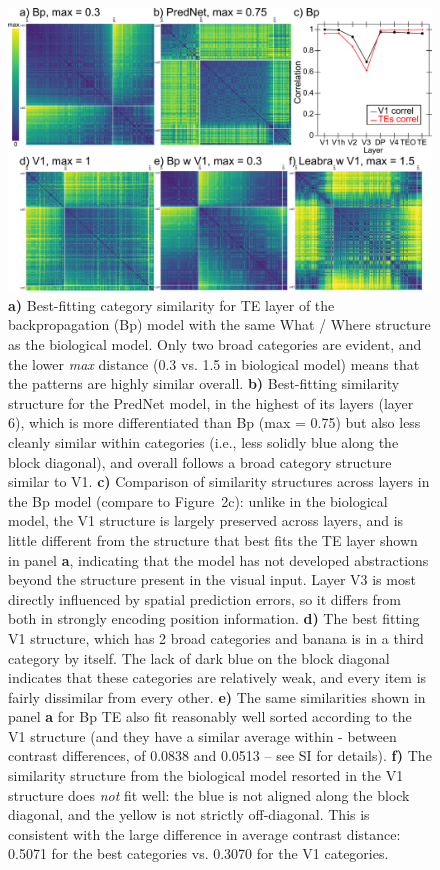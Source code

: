 \documentclass[11pt,twoside]{article}
\newif\myifpdf
\begin{document}
\begin{figure}
  \centering\includegraphics[width=4.5in]{fig_07} %
  \caption{{\bf a)} Best-fitting category similarity for TE layer of the backpropagation (Bp) model with the same What / Where structure as the biological model.  Only two broad categories are evident, and the lower \emph{max} distance (0.3 vs. 1.5 in biological model) means that the patterns are highly similar overall.  {\bf b)} Best-fitting similarity structure for the PredNet model, in the highest of its layers (layer 6), which is more differentiated than Bp (max = 0.75) but also less cleanly similar within categories (i.e., less solidly blue along the block diagonal), and overall follows a broad category structure similar to V1.  {\bf c)} Comparison of similarity structures across layers in the Bp model (compare to Figure~2c): unlike in the biological model, the V1 structure is largely preserved across layers, and is little different from the structure that best fits the TE layer shown in panel {\bf a}, indicating that the model has not developed abstractions beyond the structure present in the visual input.  Layer V3 is most directly influenced by spatial prediction errors, so it differs from both in strongly encoding position information.  {\bf d)} The best fitting V1 structure, which has 2 broad categories and banana is in a third category by itself.  The lack of dark blue on the block diagonal indicates that these categories are relatively weak, and every item is fairly dissimilar from every other.  {\bf e)} The same similarities shown in panel {\bf a} for Bp TE also fit reasonably well sorted according to the V1 structure (and they have a similar average within - between contrast differences, of 0.0838 and 0.0513 -- see SI for details).  {\bf f)} The similarity structure from the biological model resorted in the V1 structure does \emph{not} fit well: the blue is not aligned along the block diagonal, and the yellow is not strictly off-diagonal.  This is consistent with the large difference in average contrast distance: 0.5071 for the best categories vs. 0.3070 for the V1 categories.}
  \label{fig.bpred}
\end{figure}
\end{document}
